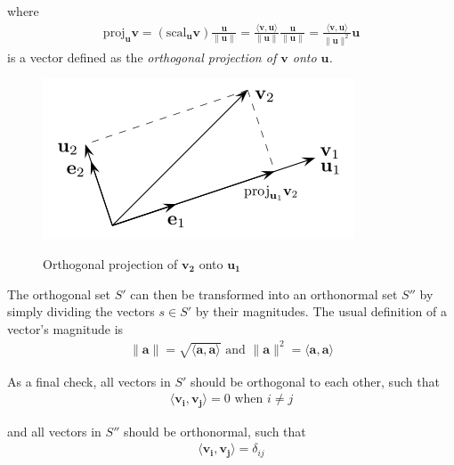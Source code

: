 \documentclass[a4paper,10pt]{report}
\newcommand{\norm}[1]{\lVert#1\rVert} 		%
\newcommand{\ip}[2]{\langle#1,#2\rangle}	%
\newcommand{\vb}[1]{\mathbf{#1}}		%
\begin{document}
    where
    \begin{align*}
      \text{proj}_{\mathbf{u}} \mathbf{v} = (\text{scal}_{\mathbf{u}} \mathbf{v})\frac{\mathbf{u}}{\mathbf{\norm{u}}}
      = \frac{\langle \mathbf{v,u} \rangle}{\norm{\mathbf{u}}}\frac{\mathbf{u}}{\mathbf{\norm{u}}}
      = \frac{\ip{\vb{v}}{\vb{u}}}{\norm{\vb{u}}^2}\vb{u}
    \end{align*}
    is a vector defined as the \textit{orthogonal projection of $\vb{v}$ onto $\vb{u}$.}

      \begin{figure}[htpb]
      \begin{centering}
      \begin{center}
      \includegraphics[width=\linewidth]{./projection.png}
      \label{fig:projection}
      \caption{Orthogonal projection of $\vb{v_2}$ onto $\vb{u_1}$}
      \end{center}
      \par\end{centering}
      \end{figure}

    The orthogonal set $S'$ can then be transformed into an orthonormal set $S''$ by simply dividing the vectors $s\in S'$ by their magnitudes. The usual definition of a vector's magnitude is
    \begin{align*}
    \norm{\vb{a}} = \sqrt{\ip{\vb{a}}{\vb{a}}} \text{ and } \norm{\vb{a}}^2 = \ip{\vb{a}}{\vb{a}}
    \end{align*}

    As a final check, all vectors in $S'$ should be orthogonal to each other, such that
    \begin{align*}
    \ip{\vb{v_i}}{\vb{v_j}} = 0 \text{ when } i \neq j
    \end{align*}

    and all vectors in $S''$ should be orthonormal, such that
    \begin{align*}
    \ip{\vb{v_i}}{\vb{v_j}} = \delta_{ij}
    \end{align*}
\end{document}
